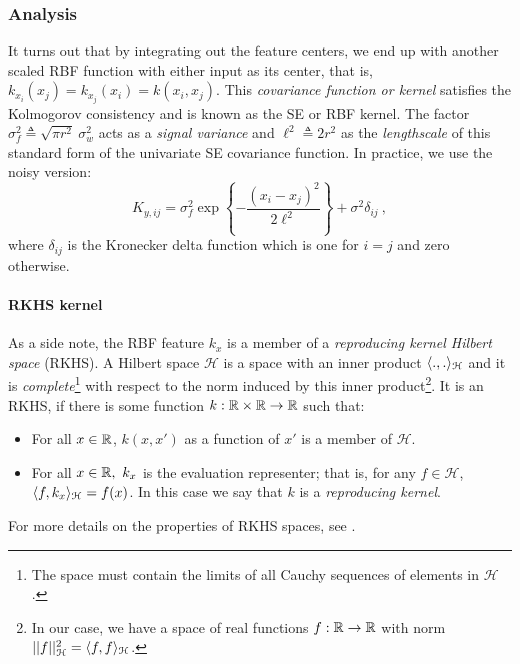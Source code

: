       \subsubsection{Analysis}
	It turns out that by integrating out the feature centers, we end up with
	another scaled RBF function with either input as its center, that is, $k_{x_i}(x_j) = k_{x_j}(x_i) = k(x_i,x_j)$.
	This \textit{covariance function or kernel} satisfies the Kolmogorov consistency and is known as the SE or RBF kernel.
	The factor $\sigma^2_f \triangleq \sqrt{\pi r^2}~\sigma^2_w$ acts as a \textit{signal variance}
	and $\ell^2 \triangleq 2r^2$ as the \textit{lengthscale} of this standard form of the
	univariate SE covariance function. In practice, we use the noisy version:
	\begin{equation} \label{equ:chap2_SEcovfunc}
	  K_{y,ij} = \sigma^2_f \exp \left\{-\frac{(x_i - x_j)^2}{2 \ell^2} \right\} + \sigma^2 \delta_{ij} ~,
	\end{equation}
	where $\delta_{ij}$ is the Kronecker delta function which is one for $i=j$ and zero otherwise.

	\paragraph{RKHS kernel} As a side note, the RBF feature $k_x$ is a member
	of a \textit{reproducing kernel Hilbert space} (RKHS).
	A Hilbert space $\mathcal{H}$ is a space with an inner product
	$\langle .,. \rangle_{\mathcal{H}}$ and it is
	\textit{complete}\footnote{The space must contain the limits of all
	Cauchy\footnotemark{} sequences of elements in $\mathcal{H}$.}
	with respect to the norm induced by this inner product\footnote{In our case, we have a space of real
	functions $f:\mathbb{R} \rightarrow \mathbb{R}$ with norm $\vert\vert f \vert\vert_\mathcal{H}^2 = \langle f,f \rangle_\mathcal{H}$.}.
	It is an RKHS, if there is some function $k: \mathbb{R} \times \mathbb{R} \rightarrow \mathbb{R}$ such that:
	\begin{itemize}
	  \item For all $x \in \mathbb{R}$, $k(x,x')$ as a function of $x'$ is a member of $\mathcal{H}$.
	  \item For all $x \in \mathbb{R}, ~ k_x$ is the evaluation representer; that is, for any $f \in \mathcal{H}$,
	    $\langle f,k_x \rangle_\mathcal{H} = f(x)$. In this case we say that $k$ is a \textit{reproducing kernel}.
	\end{itemize}
	For more details on the properties of RKHS spaces, see
	\citep{Scholkopf:book02, Rasmussen:book06, Wegman:reproducing88, Berlinet:reproducing04}.

